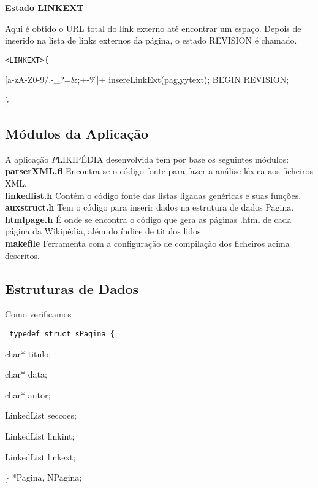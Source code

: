 \documentclass[12pt,letterpaper]{article}
\begin{document}
{\bf Estado LINKEXT}

Aqui é obtido o URL total do link externo até encontrar um espaço. Depois de inserido na lista de links externos da página, o estado REVISION é chamado.\\

{\tt <LINKEXT>\{ \par
\hspace{1.0cm}	[a-zA-Z0-9/.-\_?=\&;+-\%]+	\hspace{0.5cm} insereLinkExt(pag,yytext); BEGIN REVISION;  \par
\}\\}

\subsection{Módulos da Aplicação}

A aplicação {\emph PLIKIPÉDIA} desenvolvida tem por base os seguintes módulos:\\

{\bf parserXML.fl} Encontra-se o código fonte para fazer a análise léxica aos ficheiros XML.\\

{\bf linkedlist.h} Contém o código fonte das listas ligadas genéricas e suas funções.\\

{\bf auxstruct.h} Tem o código para inserir dados na estrutura de dados Pagina.\\

{\bf htmlpage.h} É onde se encontra o código que gera as páginas .html de cada página da Wikipédia, além do índice de títulos lidos.\\

{\bf makefile} Ferramenta com a configuração de compilação dos ficheiros acima descritos.\\


\subsection{Estruturas de Dados}

Como verificamos\\


{\tt
typedef struct sPagina \{ \par
\hspace{1cm}	char* titulo; \par
\hspace{1cm}	char* data; \par
\hspace{1cm}	char* autor; \par
\hspace{1cm}	LinkedList seccoes; \par
\hspace{1cm}	LinkedList linkint; \par
\hspace{1cm}	LinkedList linkext; \par
\} *Pagina, NPagina; \\
}
\end{document}

